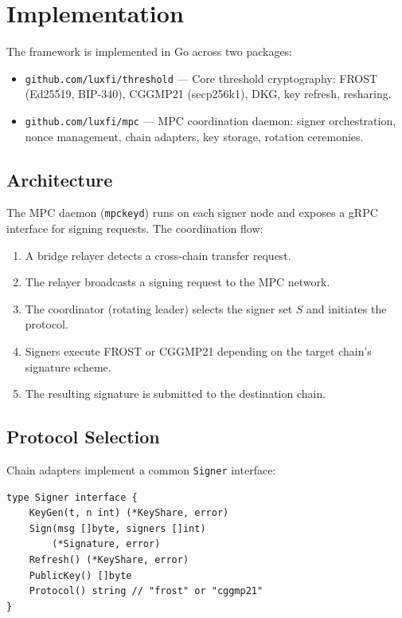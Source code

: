 \documentclass[11pt,twocolumn]{article}
\begin{document}
\section{Implementation}
\label{sec:impl}

The framework is implemented in Go across two packages:

\begin{itemize}[nosep]
  \item \texttt{github.com/luxfi/threshold} --- Core threshold cryptography: FROST
    (Ed25519, BIP-340), CGGMP21 (secp256k1), DKG, key refresh, resharing.
  \item \texttt{github.com/luxfi/mpc} --- MPC coordination daemon: signer
    orchestration, nonce management, chain adapters, key storage, rotation ceremonies.
\end{itemize}

\subsection{Architecture}

The MPC daemon (\texttt{mpckeyd}) runs on each signer node and exposes a gRPC
interface for signing requests. The coordination flow:

\begin{enumerate}[nosep]
  \item A bridge relayer detects a cross-chain transfer request.
  \item The relayer broadcasts a signing request to the MPC network.
  \item The coordinator (rotating leader) selects the signer set $S$ and initiates
    the protocol.
  \item Signers execute FROST or CGGMP21 depending on the target chain's signature
    scheme.
  \item The resulting signature is submitted to the destination chain.
\end{enumerate}

\subsection{Protocol Selection}

Chain adapters implement a common \texttt{Signer} interface:

\begin{verbatim}
type Signer interface {
    KeyGen(t, n int) (*KeyShare, error)
    Sign(msg []byte, signers []int)
        (*Signature, error)
    Refresh() (*KeyShare, error)
    PublicKey() []byte
    Protocol() string // "frost" or "cggmp21"
}
\end{verbatim}
\end{document}
